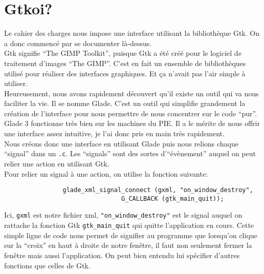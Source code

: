 \documentclass[]{report}
\begin{document}
		\section{Gtkoi?} %
		\label{sec:gtkoi_}
			Le cahier des charges nous impose une interface utilisant la biblioth\`eque Gtk. On a donc commenc\'e par se documenter l\`a-dessus.\\
			Gtk signifie ``The GIMP Toolkit'', puisque Gtk a \'et\'e cr\'e\'e pour le logiciel de traitement d'images ``The GIMP''. C'est en fait un ensemble de biblioth\`eques utilis\'e pour r\'ealiser des interfaces graphiques. Et \c ca n'avait pas l'air simple \`a utiliser.\\
			Heureusement, nous avons rapidement d\'ecouvert qu'il existe un outil qui va nous faciliter la vie. Il se nomme Glade. C'est un outil qui simplifie grandement la cr\'eation de l'interface pour nous permettre de nous concentrer sur le code ``pur''. Glade 3 fonctionne tr\`es bien sur les machines du PIE. Il a le m\'erite de nous offrir une interface assez intuitive, je l'ai donc pris en main tr\`es rapidement.\\
			Nous cr\'eons donc une interface en utilisant Glade puis nous relions chaque ``signal'' dans un \texttt{.c}. Les ``signals'' sont des sortes d'``\'ev\`enement'' auquel on peut relier une action en utilisant Gtk.\\
			Pour relier un signal \`a une action, on utilise la fonction suivante:

			\begin{verbatim}
				glade_xml_signal_connect (gxml, "on_window_destroy",
							    G_CALLBACK (gtk_main_quit));
			\end{verbatim}

			Ici, \verb!gxml! est notre fichier xml, \verb!"on_window_destroy"! est le signal auquel on rattache la fonction Gtk \verb!gtk_main_quit! qui quitte l'application en cours. Cette simple ligne de code nous permet de signifier au programme que lorsqu'on clique sur la ``croix'' en haut \`a droite de notre fen\^etre, il faut non seulement fermer la fen\^etre mais aussi l'application.
			On peut bien entendu lui sp\'ecifier d'autres fonctions que celles de Gtk.

\end{document}
